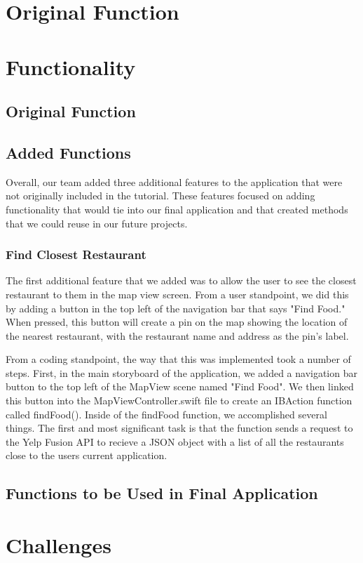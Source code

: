 \documentclass[conference]{IEEEtran}
\begin{document}
\section{Original Function}

\section{Functionality}

\subsection{Original Function}

\subsection{Added Functions}
Overall, our team added three additional features to the application that were not 
originally included in the tutorial. These features focused on adding functionality
that would tie into our final application and that created methods that we could
reuse in our future projects.

\subsubsection{Find Closest Restaurant}
The first additional feature that we added was to allow the user to see the closest
restaurant to them in the map view screen. From a user standpoint, we did this by 
adding a button in the top left of the navigation bar that says "Find Food." When 
pressed, this button will create a pin on the map showing the location of the nearest
restaurant, with the restaurant name and address as the pin's label.

From a coding standpoint, the way that this was implemented took a number of steps.
First, in the main storyboard of the application, we added a navigation bar button
to the top left of the MapView scene named "Find Food". We then linked this button
into the MapViewController.swift file to create an IBAction function called findFood().
Inside of the findFood function, we accomplished several things. The first and 
most significant task is that the function sends a request to the Yelp Fusion API
to recieve a JSON object with a list of all the restaurants close to the users current
application.

\subsection{Functions to be Used in Final Application}

\section{Challenges}
\end{document}
